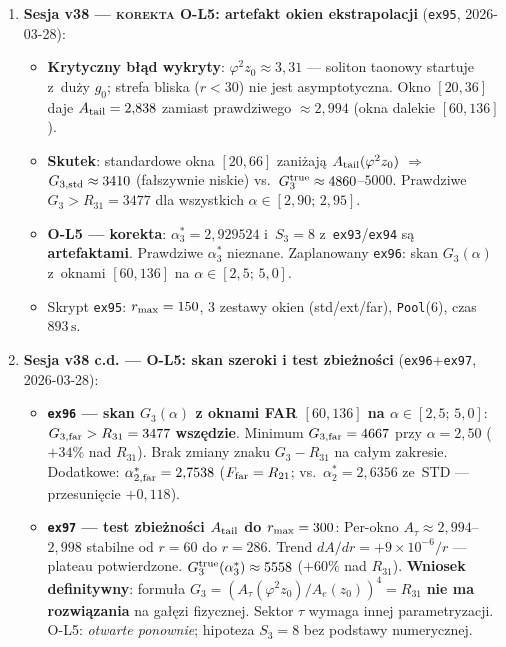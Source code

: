 \begin{remark}
\begin{enumerate}[nosep]
  \item \textbf{Sesja v38 --- \textsc{korekta O-L5}: artefakt okien ekstrapolacji}
    (\texttt{ex95}, 2026-03-28):
    \begin{itemize}[nosep]
      \item \textbf{Krytyczny b\l{}\k{a}d wykryty}: $\varphi^2 z_0\approx3{,}31$
        --- soliton taonowy startuje z~du\.zy $g_0$;
        strefa bliska ($r<30$) nie jest asymptotyczna.
        Okno $[20,36]$ daje $A_{\rm tail}=2{,}838$ zamiast prawdziwego
        $\approx2{,}994$ (okna dalekie $[60,136]$).
      \item \textbf{Skutek}: standardowe okna $[20,66]$
        zani\.zaj\k{a} $A_{\rm tail}(\varphi^2 z_0)$
        $\Rightarrow$ $G_{3,\rm std}\approx3410$ (fa\l{}szywnie niskie)
        vs.\ $G_3^{\rm true}\approx4860$--$5000$.
        Prawdziwe $G_3 > R_{31}=3477$ dla wszystkich
        $\alpha\in[2{,}90;\,2{,}95]$.
      \item \textbf{O-L5 --- korekta}: $\alpha^*_3=2{,}929524$ i~$S_3=8$
        z~\texttt{ex93}/\texttt{ex94} s\k{a} \textbf{artefaktami}.
        Prawdziwe $\alpha^*_3$ nieznane.
        Zaplanowany \texttt{ex96}: skan $G_3(\alpha)$ z~oknami
        $[60,136]$ na $\alpha\in[2{,}5;\,5{,}0]$.
      \item Skrypt \texttt{ex95}: $r_{\rm max}=150$, 3 zestawy okien
        (std/ext/far), \texttt{Pool}(6), czas $893\,\text{s}$.
    \end{itemize}

  \item \textbf{Sesja v38 c.d. --- O-L5: skan szeroki i test zbieżności}
    (\texttt{ex96}+\texttt{ex97}, 2026-03-28):
    \begin{itemize}[nosep]
      \item \textbf{\texttt{ex96} --- skan $G_3(\alpha)$ z oknami FAR $[60,136]$
        na $\alpha\in[2{,}5;\,5{,}0]$}:
        $G_{3,\rm far} > R_{31}=3477$ \textbf{wszędzie}.
        Minimum $G_{3,\rm far}=4667$ przy $\alpha=2{,}50$ ($+34\%$ nad $R_{31}$).
        Brak zmiany znaku $G_3-R_{31}$ na całym zakresie.
        Dodatkowe: $\alpha^*_{2,\rm far}=2{,}7538$ ($F_{\rm far}=R_{21}$;
        vs.\ $\alpha^*_2=2{,}6356$ ze~STD --- przesunięcie $+0{,}118$).
      \item \textbf{\texttt{ex97} --- test zbieżności $A_{\rm tail}$ do $r_{\rm max}=300$}:
        Per-okno $A_\tau\approx2{,}994$--$2{,}998$ stabilne od $r=60$ do $r=286$.
        Trend $dA/dr=+9\times10^{-6}/r$ --- plateau potwierdzone.
        $G_3^{\rm true}(\alpha^*_3)\approx5558$ ($+60\%$ nad $R_{31}$).
        \textbf{Wniosek definitywny}: formuła $G_3=(A_\tau(\varphi^2 z_0)/A_e(z_0))^4=R_{31}$
        \textbf{nie ma rozwiązania} na gałęzi fizycznej.
        Sektor $\tau$ wymaga innej parametryzacji.
        O-L5: \emph{otwarte ponownie}; hipoteza $S_3=8$ bez podstawy numerycznej.
    \end{itemize}


\end{enumerate}
\end{remark}
